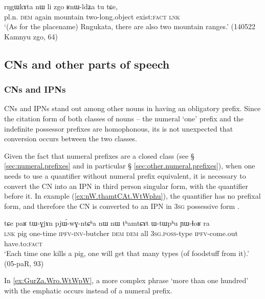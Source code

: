 \begin{exe}
\ex \label{ex:zgo.RnWldZa}
\gll rŋgɯkɤta nɯ li zgo ʁnɯ-ldʑa tu tɕe, \\
pl.n. \textsc{dem} again mountain two-long.object exist:\textsc{fact} \textsc{lnk} \\
\glt `(As for the placename) Rngukata, there are also two mountain ranges.' (140522 Kamnyu zgo, 64)
\end{exe}


\subsection{CNs and other parts of speech} \label{sec:CN.parts.of.speech}
\subsubsection{CNs and IPNs}   \label{sec:CN.IPN}
CNs and IPNs stand out among other nouns in having an obligatory prefix. Since the citation form of both classes of nouns -- the numeral `one' prefix  and the indefinite possessor prefixes  are homophonous, its is not unexpected that conversion occurs between the two classes. 

Given the fact that numeral prefixes are a closed class (see § \ref{sec:numeral.prefixes} and in particular § \ref{sec:other.numeral.prefixes}), when one needs to use a quantifier without numeral prefix equivalent, it is necessary to convert the CN into an IPN in third person singular form, with the quantifier before it. In example (\ref{ex:nW.thamtCAt.WtWphu}), the quantifier  has no prefixal form, and therefore the CN  is converted to an IPN in \textsc{3sg} possessive form .

\begin{exe}
\ex \label{ex:nW.thamtCAt.WtWphu}
\gll tɕe paʁ tɯ-ɣjɤn pjɯ́-wɣ-ntɕʰa nɯ nɯ tʰamtɕɤt ɯ-tɯpʰu ɲɯ-ɬoʁ ra \\ 
 \textsc{lnk} pig one-time \textsc{ipfv}-\textsc{inv}-butcher \textsc{dem} \textsc{dem} all \textsc{3sg}.\textsc{poss}-type \textsc{ipfv}-come.out have.to:\textsc{fact} \\
\glt `Each time one kills a pig, one will get that many types (of foodstuff from it).' (05-paR, 93)
\end{exe}

In \ref{ex:GurZa.Wro.WtWpW}, a more complex phrase  `more than one hundred' with the emphatic  occurs instead of a numeral prefix.

